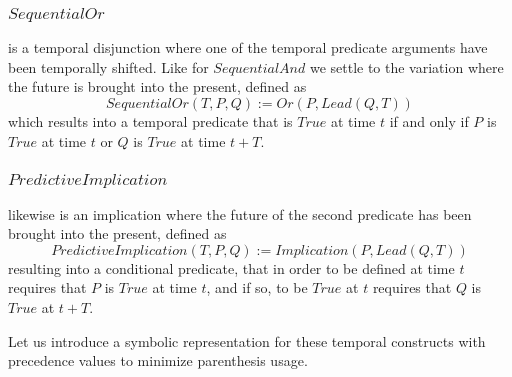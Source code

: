 \documentclass[runningheads]{llncs}
\newcommand{\TTrue}{\textit{True}}
\newcommand{\TOr}{\textit{Or}}
\newcommand{\TImpl}{\textit{Implication}}
\newcommand{\TPredImpl}{\textit{PredictiveImplication}}
\newcommand{\TSeqAnd}{\textit{SequentialAnd}}
\newcommand{\TSeqOr}{\textit{SequentialOr}}
\newcommand{\TLead}{\textit{Lead}}
\begin{document}
\subsubsection{$\TSeqOr$} is a temporal disjunction where one of the
temporal predicate arguments have been temporally shifted.  Like for
$\TSeqAnd$ we settle to the variation where the future is brought into
the present, defined as
$$\TSeqOr(T, P, Q) := \TOr(P, \TLead(Q, T))$$
which results into a temporal predicate that is $\TTrue$ at time $t$
if and only if $P$ is $\TTrue$ at time $t$ or $Q$ is $\TTrue$ at time
$t+T$.

\subsubsection{$\TPredImpl$} likewise is an implication where the
future of the second predicate has been brought into the present,
defined as
$$\TPredImpl(T, P, Q) := \TImpl(P, \TLead(Q, T))$$
resulting into a conditional predicate, that in order to be defined at
time $t$ requires that $P$ is $\TTrue$ at time $t$, and if so, to be
$\TTrue$ at $t$ requires that $Q$ is $\TTrue$ at $t+T$.

Let us introduce a symbolic representation for these temporal
constructs with precedence values to minimize parenthesis usage.

\end{document}
